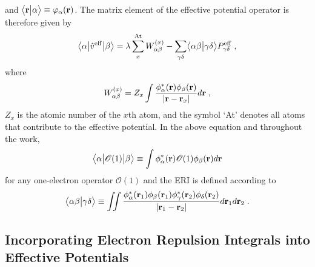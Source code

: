 \documentclass[aip,jcp,amsmath,amssymb,reprint,floatfix]{revtex4-1}
\begin{document}
%
and $\bigl\langle {\bf r} \bigl\lvert {\alpha} \bigr\rangle \equiv \varphi_\alpha({\bf r})$.
The matrix element of the effective potential operator
is therefore given by
%
\begin{equation} \label{e:oep-matrix-element}
	\bigl\langle {\alpha} \bigl\lvert { \hat{v}^{\rm eff} } \bigl\lvert {\beta} \bigr\rangle
	= \lambda \sum_x^{\rm At} W_{\alpha\beta}^{(x)} -
        \sum_{\gamma\delta} \bigl\langle {\alpha\beta} \bigl\lvert {\gamma\delta} \bigr\rangle P^{\rm eff}_{\gamma\delta}  \;,
\end{equation}
%
where 
%
\begin{equation} \label{e:oep-matrix-element-nuc}
 W_{\alpha\beta}^{(x)} = 
 Z_x \int \frac{\phi^*_\alpha({\bf r}) \phi_\beta({\bf r})}{\vert {\bf r} - {\bf r}_x \vert} d{\bf r} \;,
\end{equation}
%
$Z_x$ is the atomic number of the $x$th atom,
and the symbol `At' denotes all atoms that contribute to the effective potential.
In the above equation and throughout the work, 
%
\begin{equation} \label{e:1el-operator}
\bigl\langle {\alpha} \bigl\lvert {\mathscr{O}(1)} \bigl\lvert {\beta} \bigr\rangle \equiv \int \phi^*_\alpha({\bf r}) \mathscr{O}(1) \phi_\beta({\bf r}) d{\bf r} 
\end{equation}
%
for any one\hyp{}electron operator $\mathscr{O}(1)$ 
and the ERI
is defined according to
%
\begin{equation} \label{e:eri}
	\bigl\langle {\alpha\beta} \bigl\lvert {\gamma\delta} \bigr\rangle \equiv
	\iint 
	\frac{ \phi_\alpha^{*}({\bf r}_1) \phi_\beta({\bf r}_1) 
	       \phi_\gamma^{*}({\bf r}_2) \phi_\delta({\bf r}_2) }{ \vert {\bf r}_1 - {\bf r}_2 \vert}
	d{\bf r}_1 d{\bf r}_2  \;.
\end{equation}
%

\subsection{\label{ss:2.1.oep-technique}Incorporating Electron Repulsion Integrals into Effective Potentials}
\end{document}
